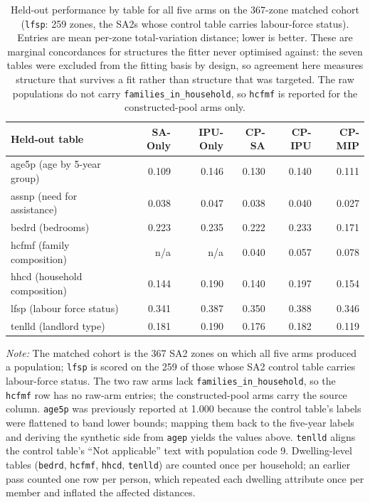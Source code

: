 \documentclass[review]{elsarticle}
\begin{document}
\begin{table}[h!]
\centering
\caption{Held-out performance by table for all five arms on the 367-zone matched cohort
(\texttt{lfsp}: 259 zones, the SA2s whose control table carries labour-force status).
Entries are mean per-zone total-variation distance; lower is better. These are marginal
concordances for structures the fitter never optimised against: the seven tables were
excluded from the fitting basis by design, so agreement here measures structure that
survives a fit rather than structure that was targeted. The raw populations do not carry
\texttt{families\_in\_household}, so \texttt{hcfmf} is reported for the constructed-pool
arms only.}
\label{tab:heldout}
\footnotesize
\setlength{\tabcolsep}{3.5pt}
\begin{tabular}{@{}lrrrrr@{}}
\toprule
\textbf{Held-out table} & \textbf{SA-Only} & \textbf{IPU-Only} & \textbf{CP-SA} & \textbf{CP-IPU} & \textbf{CP-MIP} \\
\midrule
age5p (age by 5-year group)          & 0.109 & 0.146 & 0.130 & 0.140 & 0.111 \\
assnp (need for assistance)          & 0.038 & 0.047 & 0.038 & 0.040 & 0.027 \\
bedrd (bedrooms)                     & 0.223 & 0.235 & 0.222 & 0.233 & 0.171 \\
hcfmf (family composition)           & n/a   & n/a   & 0.040 & 0.057 & 0.078 \\
hhcd (household composition)         & 0.144 & 0.190 & 0.140 & 0.197 & 0.154 \\
lfsp (labour force status)           & 0.341 & 0.387 & 0.350 & 0.388 & 0.346 \\
tenlld (landlord type)               & 0.181 & 0.190 & 0.176 & 0.182 & 0.119 \\
\bottomrule
\end{tabular}

\par\smallskip
{\footnotesize\textit{Note:} The matched cohort is the 367 SA2 zones on which all five
arms produced a population; \texttt{lfsp} is scored on the 259 of those whose SA2 control
table carries labour-force status. The two raw arms lack \texttt{families\_in\_household}, so the
\texttt{hcfmf} row has no raw-arm entries; the constructed-pool arms carry the source
column. \texttt{age5p} was previously reported at 1.000 because the control table's labels
were flattened to band lower bounds; mapping them back to the five-year labels and deriving
the synthetic side from \texttt{agep} yields the values above. \texttt{tenlld} aligns the
control table's ``Not applicable'' text with population code 9. Dwelling-level tables
(\texttt{bedrd}, \texttt{hcfmf}, \texttt{hhcd}, \texttt{tenlld}) are counted once per
household; an earlier pass counted one row per person, which repeated each dwelling
attribute once per member and inflated the affected distances.}
\end{table}
\end{document}
